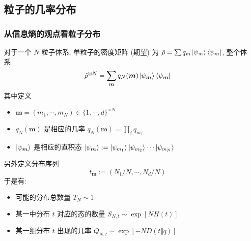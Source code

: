 \documentclass[12pt,hyperref={CJKbookmarks=true}]{beamer}
\renewcommand*{\vec}[1]{\bm{#1}}
\begin{document}
\subsection{粒子的几率分布}
\begin{frame}
    \frametitle[关于粒子分布]{从信息熵的观点看粒子分布}
    对于一个 $N$ 粒子体系, 
    单粒子的密度矩阵 (期望) 为 $\hat\rho = \sum q_m\ket{\psi_m}\bra{\psi_m}$, 
    整个体系
    \begin{equation}
        \hat\rho^{\otimes N} = \sum_{\vec m}q_N(\vec m)\ket{\psi_{\vec m}}\bra{\psi_{\vec m}}
    \end{equation}
    其中定义
    \begin{itemize}
        \item $\vec m = (m_1,\cdots, m_N)\in\{1,\cdots,d\}^{\times N}$
        \item $q_N(\vec m)$ 是相应的几率 $q_N(\vec m) = \prod_i q_{m_i}$ 
        \item $\ket{\psi_{\vec m}}$ 是相应的直积态 
        $\ket{\psi_{\vec m}} := \ket{\psi_{m_1}}\ket{\psi_{m_2}}\cdots\ket{\psi_{m_N}}$
    \end{itemize}

    另外定义分布序列
    \begin{equation}
        t_{\vec m}:=(N_1/N,\cdots,N_{d}/N)
    \end{equation}
    于是有:
    \begin{itemize}
        \item 可能的分布总数量 $T_N \sim 1$
        \item 某一中分布 $t$ 对应的态的数量 $S_{N,t} \sim \exp[N H(t)]$ 
        \item 某一组分布 $t$ 出现的几率 $Q_{N,t}\sim \exp[-ND(t\Vert q)]$
    \end{itemize}
\end{frame}
\end{document}
